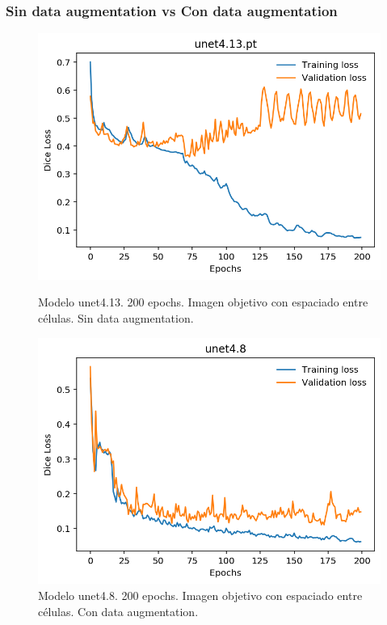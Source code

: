 \clearpage \subsubsection{Sin data augmentation vs Con data augmentation}
\begin{figure}[ht]
\centering
\includegraphics[scale=0.8]{img/unet4.13-200e-LQNOB-norm-Znorm.png} 
\caption{Modelo unet4.13. 200 epochs. Imagen objetivo con espaciado entre células. Sin data augmentation.}
\includegraphics[scale=0.8]{img/unet4.8-200e-aug.png} 
\caption{Modelo unet4.8. 200 epochs. Imagen objetivo con espaciado entre células. Con data augmentation.}\bigskip 
\end{figure}

